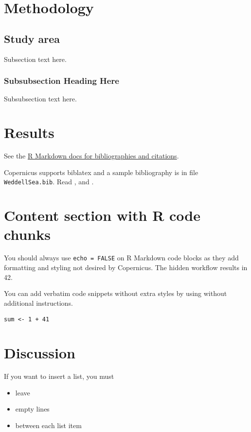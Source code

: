 \documentclass[gc, manuscript]{copernicus}
\begin{document}
\section{Methodology}

\subsection{Study area}

Subsection text here.

\subsubsection{Subsubsection Heading Here}

Subsubsection text here.

\section{Results}

See the
\href{http://rmarkdown.rstudio.com/authoring_bibliographies_and_citations.html}{R
Markdown docs for bibliographies and citations}.

Copernicus supports biblatex and a sample bibliography is in file
\texttt{WeddellSea.bib}. Read \citep{Pawar2012}, and
\citep[see][]{Dirac1953888}.

\section{Content section with R code chunks}

You should always use \texttt{echo\ =\ FALSE} on R Markdown code blocks
as they add formatting and styling not desired by Copernicus. The hidden
workflow results in 42.

You can add verbatim code snippets without extra styles by using
\texttt{\textasciigrave{}\textasciigrave{}\textasciigrave{}} without
additional instructions.

\begin{verbatim}
sum <- 1 + 41
\end{verbatim}

\section{Discussion}

If you want to insert a list, you must

\begin{itemize}
\item
  leave
\item
  empty lines
\item
  between each list item
\end{itemize}
\end{document}
